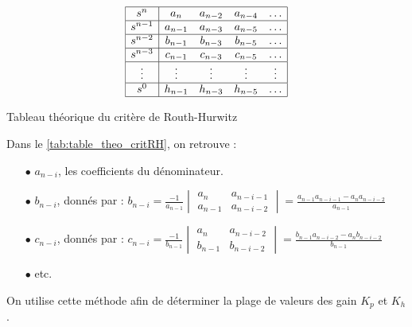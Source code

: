 \documentclass[a4paper,12pt]{article}
\begin{document}
\begin{table}[ht]
    \centering
    \[
    \begin{array}{|c|c c c c|}
        \hline
        s^n & a_n & a_{n-2} & a_{n-4} & \dots \\
        \hline
        s^{n-1} & a_{n-1} & a_{n-3} & a_{n-5} & \dots \\
        \hline
        s^{n-2} & b_{n-1} & b_{n-3} & b_{n-5} & \dots \\
        \hline
        s^{n-3} & c_{n-1} & c_{n-3} & c_{n-5} & \dots \\
        \hline
        \vdots & \vdots & \vdots & \vdots & \vdots \\
        \hline
        s^0 & h_{n-1} & h_{n-3} & h_{n-5} & \dots \\
        \hline
    \end{array}
    \]
    \caption{Tableau théorique du critère de Routh-Hurwitz}
    \label{tab:table_theo_critRH}
\end{table}

Dans le \autoref{tab:table_theo_critRH}, on retrouve :
\begin{itemize}
    \item[$\bullet$] $a_{n-i}$, les coefficients du dénominateur.
    \item[$\bullet$] $b_{n-i}$, donnés par :
        $b_{n-i} = \frac{-1}{a_{n-1}}
        \begin{vmatrix}
            a_n & a_{n-i-1} \\
            a_{n-1} & a_{n-i-2}
        \end{vmatrix}
        = \frac{a_{n-1} a_{n-i-1} - a_n a_{n-i-2}}{a_{n-1}}$
    \item[$\bullet$] $c_{n-i}$, donnés par :
        $c_{n-i} = \frac{-1}{b_{n-1}}
        \begin{vmatrix}
            a_n & a_{n-i-2} \\
            b_{n-1} & b_{n-i-2}
        \end{vmatrix}
        = \frac{b_{n-1} a_{n-i-2} - a_n b_{n-i-2}}{b_{n-1}}$
    \item[$\bullet$] etc.
\end{itemize} 

On utilise cette méthode afin de déterminer la plage de valeurs des gain $K_p$ et $K_h$.
\end{document}
